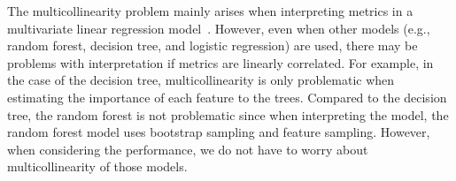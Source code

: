 The multicollinearity problem mainly arises when interpreting metrics in a multivariate linear regression model~\cite{gujarati2009basic}. However, even when other models (e.g., random forest, decision tree, and logistic regression) are used, there may be problems with interpretation if metrics are linearly correlated. 
For example, in the case of the decision tree, multicollinearity is only problematic when estimating the importance of each feature to the trees.
Compared to the decision tree, the random forest is not problematic since when interpreting the model, the random forest model uses bootstrap sampling and feature sampling. 
However, when considering the performance, we do not have to worry about multicollinearity of those models.




